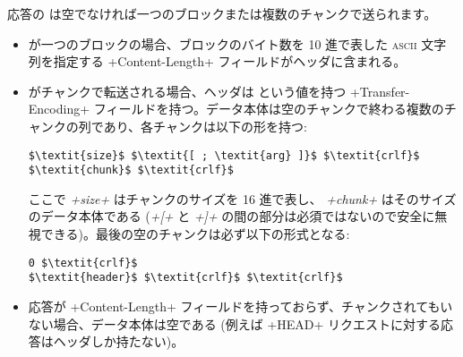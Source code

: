 応答の \textit{} は空でなければ一つのブロックまたは複数のチャンクで送られます。

\begin{itemize}
\item \textit{} が一つのブロックの場合、ブロックのバイト数を 10 進で表した \textsc{ascii} 文字列を指定する \ml+Content-Length+ フィールドがヘッダに含まれる。

\item \textit{} がチャンクで転送される場合、ヘッダは  という値を持つ \ml+Transfer-Encoding+ フィールドを持つ。データ本体は空のチャンクで終わる複数のチャンクの列であり、各チャンクは以下の形を持つ:
%
\begin{lstlisting}
$\textit{size}$ $\textit{[ ; \textit{arg} ]}$ $\textit{crlf}$
$\textit{chunk}$ $\textit{crlf}$
\end{lstlisting}
%
ここで \textit{\ml+size+} はチャンクのサイズを 16 進で表し、 \textit{\ml+chunk+} はそのサイズのデータ本体である (\textit{\ml+[+} と \textit{\ml+]+} の間の部分は必須ではないので安全に無視できる)。最後の空のチャンクは必ず以下の形式となる:
%
\begin{lstlisting}
0 $\textit{crlf}$
$\textit{header}$ $\textit{crlf}$ $\textit{crlf}$
\end{lstlisting}
%
\item 応答が \ml+Content-Length+ フィールドを持っておらず、チャンクされてもいない場合、データ本体は空である (例えば \ml+HEAD+ リクエストに対する応答はヘッダしか持たない)。
\end{itemize}
